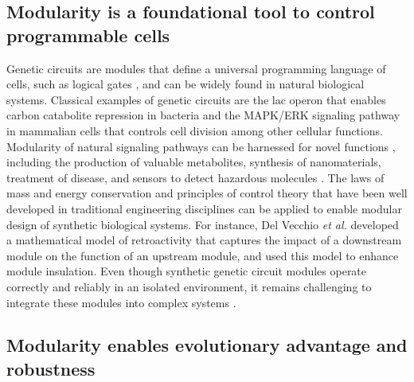 \subsection{Modularity is a foundational tool to control programmable cells}

Genetic circuits are modules that define a universal programming language of cells, such as logical gates \citep{brophy2014, nielsen2016}, and can be widely found in natural biological systems.
Classical examples of genetic circuits are the lac operon that enables carbon catabolite repression in bacteria and the MAPK/ERK signaling pathway in mammalian cells that controls cell division among other cellular functions.
Modularity of natural signaling pathways can be harnessed for novel functions \citep{lim2010, pryciak2009}, including the production of valuable metabolites, synthesis of nanomaterials, treatment of disease, and sensors to detect hazardous molecules \citep{brophy2014}.
The laws of mass and energy conservation and principles of control theory that have been well developed in traditional engineering disciplines can be applied to enable modular design of synthetic biological systems.
For instance, Del Vecchio \emph{et al.} \citep{del2008} developed a mathematical model of retroactivity that captures the impact of a downstream module on the function of an upstream module, and used this model to enhance module insulation.
Even though synthetic genetic circuit modules operate correctly and reliably in an isolated environment, it remains challenging to integrate these modules into complex systems \citep{purnick2009}.

\subsection{Modularity enables evolutionary advantage and robustness}

